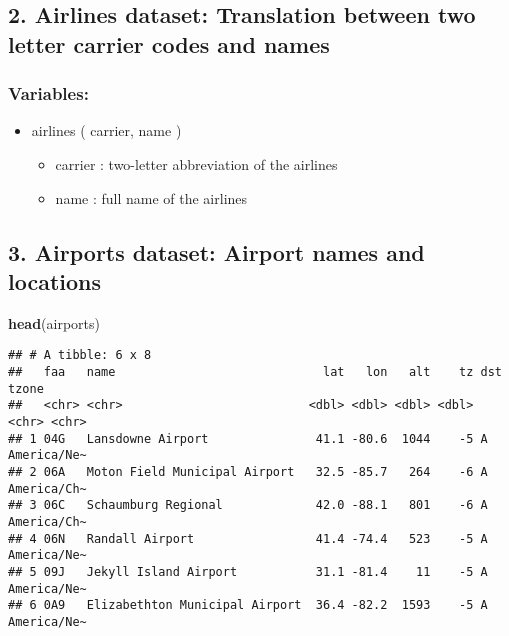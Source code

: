 \documentclass[
]{article}
\newenvironment{Shaded}{\begin{snugshade}}{\end{snugshade}}
\newcommand{\FunctionTok}[1]{\textcolor[rgb]{0.13,0.29,0.53}{\textbf{#1}}}
\newcommand{\NormalTok}[1]{#1}
\providecommand{\tightlist}{%
  \setlength{\itemsep}{0pt}\setlength{\parskip}{0pt}}
\begin{document}
\subsection{2. Airlines dataset: Translation between two letter carrier
codes and
names}\label{airlines-dataset-translation-between-two-letter-carrier-codes-and-names}

\subsubsection{Variables:}\label{variables-1}

\begin{itemize}
\tightlist
\item
  airlines ( carrier, name )

  \begin{itemize}
  \tightlist
  \item
    carrier : two-letter abbreviation of the airlines
  \item
    name : full name of the airlines
  \end{itemize}
\end{itemize}

\subsection{3. Airports dataset: Airport names and
locations}\label{airports-dataset-airport-names-and-locations}

\begin{Shaded}
\begin{Highlighting}[]
\FunctionTok{head}\NormalTok{(airports)}
\end{Highlighting}
\end{Shaded}

\begin{verbatim}
## # A tibble: 6 x 8
##   faa   name                             lat   lon   alt    tz dst   tzone      
##   <chr> <chr>                          <dbl> <dbl> <dbl> <dbl> <chr> <chr>      
## 1 04G   Lansdowne Airport               41.1 -80.6  1044    -5 A     America/Ne~
## 2 06A   Moton Field Municipal Airport   32.5 -85.7   264    -6 A     America/Ch~
## 3 06C   Schaumburg Regional             42.0 -88.1   801    -6 A     America/Ch~
## 4 06N   Randall Airport                 41.4 -74.4   523    -5 A     America/Ne~
## 5 09J   Jekyll Island Airport           31.1 -81.4    11    -5 A     America/Ne~
## 6 0A9   Elizabethton Municipal Airport  36.4 -82.2  1593    -5 A     America/Ne~
\end{verbatim}
\end{document}
